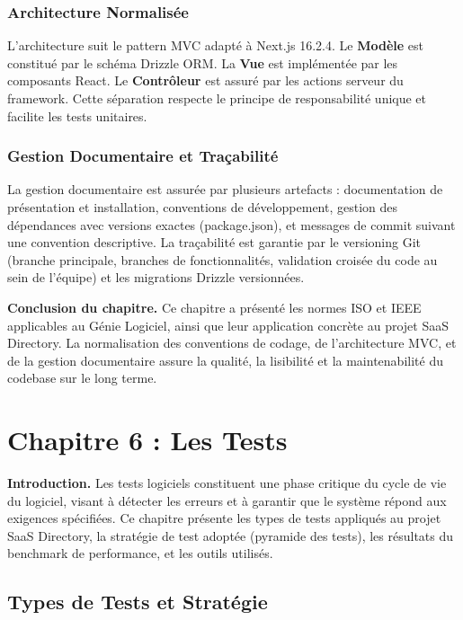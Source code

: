 \subsubsection{Architecture Normalisée}

L'architecture suit le pattern MVC adapté à Next.js 16.2.4. Le \textbf{Modèle} est constitué par le schéma Drizzle ORM. La \textbf{Vue} est implémentée par les composants React. Le \textbf{Contrôleur} est assuré par les actions serveur du framework. Cette séparation respecte le principe de responsabilité unique et facilite les tests unitaires.

\subsubsection{Gestion Documentaire et Traçabilité}

La gestion documentaire est assurée par plusieurs artefacts : documentation de présentation et installation, conventions de développement, gestion des dépendances avec versions exactes (package.json), et messages de commit suivant une convention descriptive. La traçabilité est garantie par le versioning Git (branche principale, branches de fonctionnalités, validation croisée du code au sein de l'équipe) et les migrations Drizzle versionnées.

\textbf{Conclusion du chapitre.} Ce chapitre a présenté les normes ISO et IEEE applicables au Génie Logiciel, ainsi que leur application concrète au projet SaaS Directory. La normalisation des conventions de codage, de l'architecture MVC, et de la gestion documentaire assure la qualité, la lisibilité et la maintenabilité du codebase sur le long terme.


\section{Chapitre 6 : Les Tests}

\textbf{Introduction.} Les tests logiciels constituent une phase critique du cycle de vie du logiciel, visant à détecter les erreurs et à garantir que le système répond aux exigences spécifiées. Ce chapitre présente les types de tests appliqués au projet SaaS Directory, la stratégie de test adoptée (pyramide des tests), les résultats du benchmark de performance, et les outils utilisés.

\subsection{Types de Tests et Stratégie}

